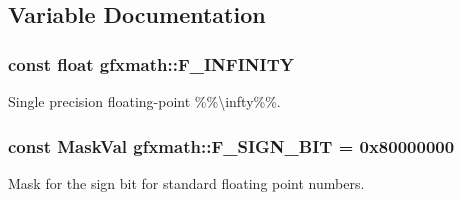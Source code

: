 \subsection{Variable Documentation}
\hypertarget{group___math_consts_gaa4b8aaaeaf14dfc8a07938655564fcf7}{}
\subsubsection[{F\+\_\+\+I\+N\+F\+I\+N\+I\+T\+Y}]{\setlength{\rightskip}{0pt plus 5cm}const float gfxmath\+::\+F\+\_\+\+I\+N\+F\+I\+N\+I\+T\+Y}\label{group___math_consts_gaa4b8aaaeaf14dfc8a07938655564fcf7}


Single precision floating-\/point \%\%\textbackslash{}infty\%\%. 

\hypertarget{group___math_consts_gad2489c06f986e5af29bfb5c2eaca185f}{}
\subsubsection[{F\+\_\+\+S\+I\+G\+N\+\_\+\+B\+I\+T}]{\setlength{\rightskip}{0pt plus 5cm}const Mask\+Val gfxmath\+::\+F\+\_\+\+S\+I\+G\+N\+\_\+\+B\+I\+T = 0x80000000}\label{group___math_consts_gad2489c06f986e5af29bfb5c2eaca185f}


Mask for the sign bit for standard floating point numbers. 

